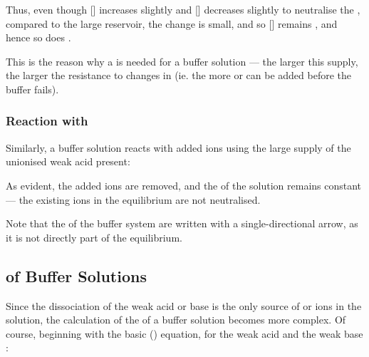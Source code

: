 				\diagram[1.5]{
					$[H^{+}] = \MKa \times \frac{[CH_{3}CO_{2}H]}{[CH_{3}CO_{2}^{-}]}$
				}{}

				Thus, even though [] increases slightly and [] decreases slightly to neutralise the , compared
				to the large reservoir, the change is small, and so [] remains , and hence so does \pH{}.

				This is the reason why a  is needed for a buffer solution --- the larger this supply, the larger the
				resistance to changes in \pH{} (ie. the more  or  can be added before the buffer fails).



			\pagebreak
			\subsubsection{Reaction with \texorpdfstring{}{OH⁻}}

				Similarly, a buffer solution reacts with added  ions using the large supply of the unionised weak acid present:


				As evident, the added  ions are removed, and the \pH{} of the solution remains constant --- the existing  ions
				in the equilibrium are not neutralised.

				Note that the  of the buffer system are written with a single-directional arrow, as it is not
				directly part of the equilibrium.



		\subsection{\texorpdfstring{\pH{}}{pH} of Buffer Solutions}

			Since the dissociation of the weak acid or base is  the only source of  or  ions in the solution,
			the calculation of the \pH{} of a buffer solution becomes more complex. Of course, beginning with the basic ()
			equation, for the weak acid  and the weak base :

